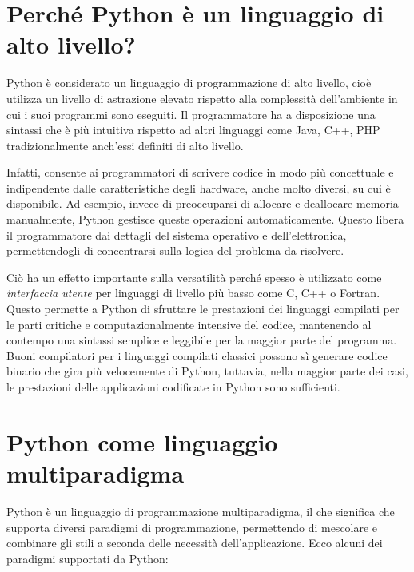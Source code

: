 \documentclass[
  letterpaper,
  DIV=11,
  numbers=noendperiod]{scrreprt}
\begin{document}
\section{Perché Python è un linguaggio di alto
livello?}\label{perchuxe9-python-uxe8-un-linguaggio-di-alto-livello}

Python è considerato un linguaggio di programmazione di alto livello,
cioè utilizza un livello di astrazione elevato rispetto alla complessità
dell'ambiente in cui i suoi programmi sono eseguiti. Il programmatore ha
a disposizione una sintassi che è più intuitiva rispetto ad altri
linguaggi come Java, C++, PHP tradizionalmente anch'essi definiti di
alto livello.

Infatti, consente ai programmatori di scrivere codice in modo più
concettuale e indipendente dalle caratteristiche degli hardware, anche
molto diversi, su cui è disponibile. Ad esempio, invece di preoccuparsi
di allocare e deallocare memoria manualmente, Python gestisce queste
operazioni automaticamente. Questo libera il programmatore dai dettagli
del sistema operativo e dell'elettronica, permettendogli di concentrarsi
sulla logica del problema da risolvere.

Ciò ha un effetto importante sulla versatilità perché spesso è
utilizzato come \emph{interfaccia utente} per linguaggi di livello più
basso come C, C++ o Fortran. Questo permette a Python di sfruttare le
prestazioni dei linguaggi compilati per le parti critiche e
computazionalmente intensive del codice, mantenendo al contempo una
sintassi semplice e leggibile per la maggior parte del programma. Buoni
compilatori per i linguaggi compilati classici possono sì generare
codice binario che gira più velocemente di Python, tuttavia, nella
maggior parte dei casi, le prestazioni delle applicazioni codificate in
Python sono sufficienti.

\section{Python come linguaggio
multiparadigma}\label{python-come-linguaggio-multiparadigma}

Python è un linguaggio di programmazione multiparadigma, il che
significa che supporta diversi paradigmi di programmazione, permettendo
di mescolare e combinare gli stili a seconda delle necessità
dell'applicazione. Ecco alcuni dei paradigmi supportati da Python:
\end{document}
